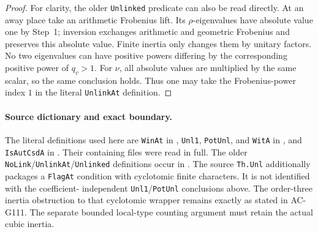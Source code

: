 \begin{proof}
For clarity, the older \texttt{Unlinked} predicate can
also be read directly. At an away place take an
arithmetic Frobenius lift. Its \(\rho\)-eigenvalues
have absolute value one by Step~1; inversion exchanges
arithmetic and geometric Frobenius and preserves this
absolute value. Finite inertia only changes them by
unitary factors. No two eigenvalues can have positive
powers differing by the corresponding positive power
of \(q_v>1\). For \(\nu\), all absolute values are
multiplied by the same scalar, so the same conclusion
holds. Thus one may take the Frobenius-power index
\(1\) in the literal \texttt{UnlinkAt} definition.
\end{proof}

\paragraph{Source dictionary and exact boundary.}
The literal definitions used here are \texttt{WinAt}
in ,
\texttt{Unl1}, \texttt{PotUnl}, and \texttt{WitA}
in , and
\texttt{IsAutCsdA} in .
Their containing files were read in full. The older
\texttt{NoLink}/\texttt{UnlinkAt}/\texttt{Unlinked}
definitions occur in .
The source \texttt{Th.Unl} additionally packages a
\texttt{FlagAt} condition with cyclotomic finite
characters. It is not identified with the coefficient-
independent \texttt{Unl1}/\texttt{PotUnl} conclusions
above. The order-three inertia obstruction to that
cyclotomic wrapper remains exactly as stated in
AC-G111. The separate bounded local-type counting
argument must retain the actual cubic inertia.

